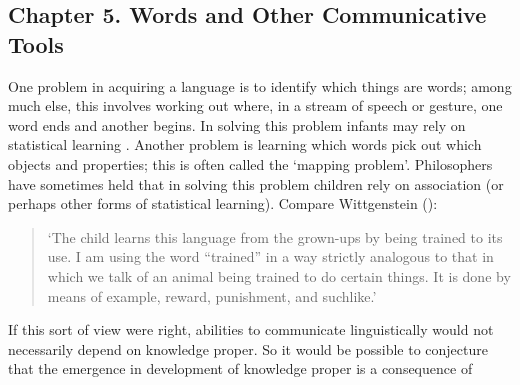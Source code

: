 \documentclass[12pt,\papersize]{extarticle}
\begin{document}
\subsection{Chapter 5. Words and Other Communicative Tools}
One problem in acquiring a language is to identify which things are words; among much else, this involves working out where, in a stream of speech or gesture, one word ends and another begins.  
In solving this problem infants may rely on statistical learning \citep{Saffran:1996aj}.
Another problem is learning which words pick out which objects and properties; this is often called the `mapping problem'. 
Philosophers have sometimes held that in solving this problem children rely on association (or perhaps other forms of statistical learning).
Compare Wittgenstein (\citeyear[p.\ 77]{Wittgenstein:1972lj}): 
%
\begin{quote}
`The child learns this language from the grown-ups by being trained to its use. I am using the word ``trained'' in a way strictly analogous to that in which we talk of an animal being trained to do certain things. It is done by means of example, reward, punishment, and suchlike.'
%
\end{quote}
%
If this sort of view were right, abilities to communicate linguistically would not necessarily depend on knowledge proper. 
So it would be possible to conjecture that the emergence in development of knowledge proper is a consequence of 
\end{document}

